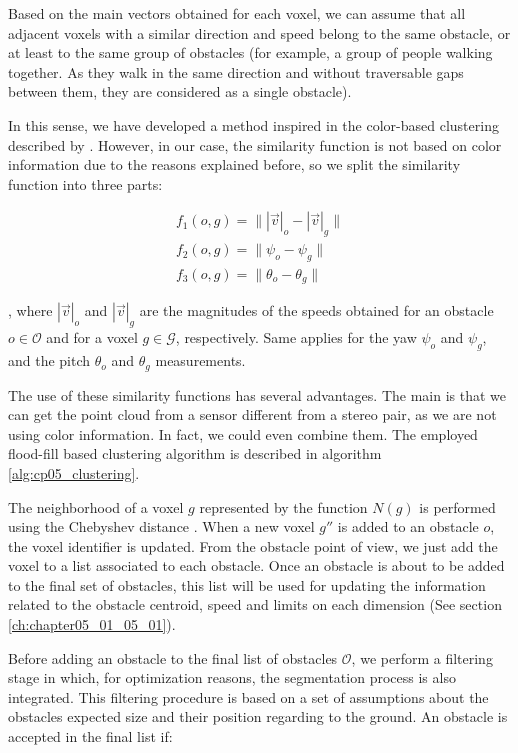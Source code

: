Based on the main vectors obtained for each voxel, we can assume that all adjacent voxels with a similar direction and speed belong to the same obstacle, or at least to the same group of obstacles (for example, a group of people walking together. As they walk in the same direction and without traversable gaps between them, they are considered as a single obstacle).

In this sense, we have developed a method inspired in the color-based clustering described by \cite{broggi2013}. However, in our case, the similarity function is not based on color information due to the reasons explained before, so we split the similarity function into three parts:

\begin{equation}\label{eq:cp05_similarity_functions}
\begin{array}{l}
f_1(o,g)=\| |\vec{v}|_o - |\vec{v}|_g \|\\
f_2(o,g)=\| \psi_o - \psi_g \|\\
f_3(o,g)=\| \theta_o - \theta_g \|
\end{array}
\end{equation}

, where $|\vec{v}|_o$ and $|\vec{v}|_g$ are the magnitudes of the speeds obtained for an obstacle $o \in \mathcal{O}$ and for a voxel $g \in \mathcal{G}$, respectively. Same applies for the yaw $\psi_o$ and $\psi_g$, and the pitch $\theta_o$ and $\theta_g$ measurements.

The use of these similarity functions has several advantages. The main is that we can get the point cloud from a sensor different from a stereo pair, as we are not using color information. In fact, we could even combine them. The employed flood-fill based clustering algorithm is described in algorithm \ref{alg:cp05_clustering}.

The neighborhood of a voxel $g$ represented by the function $N(g)$ is performed using the Chebyshev distance \citep{broggi2013}. When a new voxel $g''$ is added to an obstacle $o$, the voxel identifier is updated. From the obstacle point of view, we just add the voxel to a list associated to each obstacle. Once an obstacle is about to be added to the final set of obstacles, this list will be used for updating the information related to the obstacle centroid, speed and limits on each dimension (See section \ref{ch:chapter05_01_05_01}).

Before adding an obstacle to the final list of obstacles $\mathcal{O}$, we perform a filtering stage in which, for optimization reasons, the segmentation process is also integrated. This filtering procedure is based on a set of assumptions about the obstacles expected size and their position regarding to the ground. An obstacle is accepted in the final list if:

